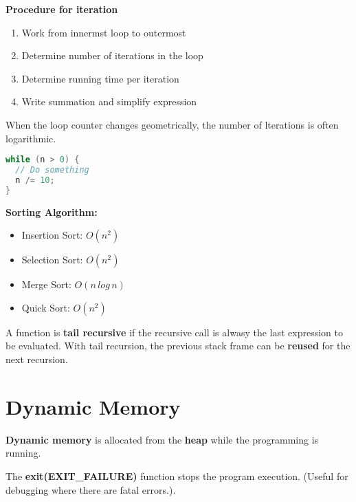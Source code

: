 \documentclass[english, 12pt]{article}
\begin{document}
\begin{mthd}
\textbf{Procedure for iteration}
\begin{enumerate}
\item Work from innermst loop to outermost
\item Determine number of iterations in the loop
\item Determine running time per iteration
\item Write summation and simplify expression
\end{enumerate}
\end{mthd}

\begin{note}
When the loop counter changes geometrically, the number of lterations is often logarithmic.
\begin{lstlisting}[language=C]
while (n > 0) {
  // Do something
  n /= 10;
}
\end{lstlisting}
\end{note}

\begin{exmp}
\textbf{Sorting Algorithm:}
\begin{itemize}
\item Insertion Sort: $O(n^2)$
\item Selection Sort: $O(n^2)$
\item Merge Sort: $O(n\,log\,n)$
\item Quick Sort: $O(n^2)$
\end{itemize}
\end{exmp}

\begin{defn}
A function is \textbf{tail recursive} if the recursive call is alwasy the last expression to be evaluated. With tail recursion, the previous stack frame can be \textbf{reused} for the next recursion.
\end{defn}

\section{Dynamic Memory}

\begin{defn}
\textbf{Dynamic memory} is allocated from the \textbf{heap} while the programming is running.
\end{defn}

\begin{defn}
The \textbf{exit(EXIT\_FAILURE)} function stops the program execution. (Useful for debugging where there are fatal errors.).
\end{defn}
\end{document}
